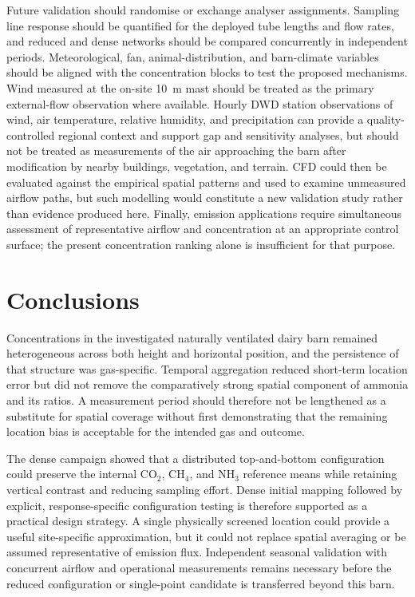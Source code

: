 \documentclass[12pt,a4paper]{article}
\begin{document}
Future validation should randomise or exchange analyser assignments. Sampling
line response should be quantified for the deployed tube lengths and flow
rates, and reduced and dense networks should be compared concurrently in
independent periods.
Meteorological, fan, animal-distribution, and barn-climate variables should be
aligned with the concentration blocks to test the proposed mechanisms. Wind
measured at the on-site \SI{10}{m} mast should be treated as the primary
external-flow observation where available. Hourly DWD station observations of
wind, air temperature, relative humidity, and precipitation can provide a
quality-controlled regional context and support gap and sensitivity analyses,
but should not be treated as measurements of the air approaching the barn
after modification by nearby buildings, vegetation, and terrain.
CFD could then be evaluated against the empirical spatial patterns and used to
examine unmeasured airflow paths, but such modelling would constitute a new
validation study rather than evidence produced here. Finally, emission
applications require simultaneous assessment of representative airflow and
concentration at an appropriate control surface; the present concentration
ranking alone is insufficient for that purpose.

\section{Conclusions}

Concentrations in the investigated naturally ventilated dairy barn remained
heterogeneous across both height and horizontal position, and the persistence
of that structure was gas-specific. Temporal aggregation reduced short-term
location error but did not remove the comparatively strong spatial component
of ammonia and its ratios. A measurement period should therefore not be
lengthened as a substitute for spatial coverage without first demonstrating
that the remaining location bias is acceptable for the intended gas and
outcome.

The dense campaign showed that a distributed top-and-bottom configuration
could preserve the internal \(\mathrm{CO_2}\), \(\mathrm{CH_4}\), and
\(\mathrm{NH_3}\) reference means while retaining vertical contrast and
reducing sampling effort. Dense initial mapping followed by explicit,
response-specific configuration testing is therefore supported as a practical
design strategy. A single physically screened location could provide a useful
site-specific approximation, but it could not replace spatial averaging or be
assumed representative of emission flux. Independent seasonal validation with
concurrent airflow and operational measurements remains necessary before the
reduced configuration or single-point candidate is transferred beyond this
barn.
\end{document}
